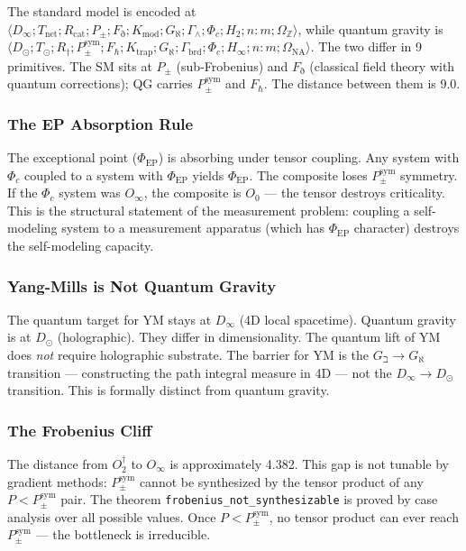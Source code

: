 \documentclass[12pt,a4paper]{article}
\begin{document}
The standard model is encoded at $\langle D_{\infty}; T_\text{net}; R_\text{cat}; P_{\pm}; F_{\eth}; K_\text{mod}; G_{\aleph}; \Gamma_{\wedge}; \Phi_c; H_2; n{:}m; \Omega_\mathbb{Z} \rangle$, while quantum gravity is $\langle D_{\odot}; T_{\odot}; R_{\dagger}; P_{\pm}^{\text{sym}}; F_{\hbar}; K_\text{trap}; G_{\aleph}; \Gamma_\text{brd}; \Phi_c; H_{\infty}; n{:}m; \Omega_\text{NA} \rangle$. The two differ in 9 primitives. The SM sits at $P_{\pm}$ (sub-Frobenius) and $F_{\eth}$ (classical field theory with quantum corrections); QG carries $P_{\pm}^{\text{sym}}$ and $F_{\hbar}$. The distance between them is 9.0.

\subsubsection{The EP Absorption Rule}

The exceptional point ($\Phi_\text{EP}$) is absorbing under tensor coupling. Any system with $\Phi_c$ coupled to a system with $\Phi_\text{EP}$ yields $\Phi_\text{EP}$. The composite loses $P_{\pm}^{\text{sym}}$ symmetry. If the $\Phi_c$ system was $O_{\infty}$, the composite is $O_0$ --- the tensor destroys criticality. This is the structural statement of the measurement problem: coupling a self-modeling system to a measurement apparatus (which has $\Phi_\text{EP}$ character) destroys the self-modeling capacity.

\subsubsection{Yang-Mills is Not Quantum Gravity}

The quantum target for YM stays at $D_{\infty}$ (4D local spacetime). Quantum gravity is at $D_{\odot}$ (holographic). They differ in dimensionality. The quantum lift of YM does \emph{not} require holographic substrate. The barrier for YM is the $G_{\beth} \to G_{\aleph}$ transition --- constructing the path integral measure in 4D --- not the $D_{\infty} \to D_{\odot}$ transition. This is formally distinct from quantum gravity.

\subsubsection{The Frobenius Cliff}

The distance from $O_2^\dagger$ to $O_{\infty}$ is approximately 4.382. This gap is not tunable by gradient methods: $P_{\pm}^{\text{sym}}$ cannot be synthesized by the tensor product of any $P < P_{\pm}^{\text{sym}}$ pair. The theorem \texttt{frobenius\_not\_synthesizable} is proved by case analysis over all possible values. Once $P < P_{\pm}^{\text{sym}}$, no tensor product can ever reach $P_{\pm}^{\text{sym}}$ --- the bottleneck is irreducible.
\end{document}
